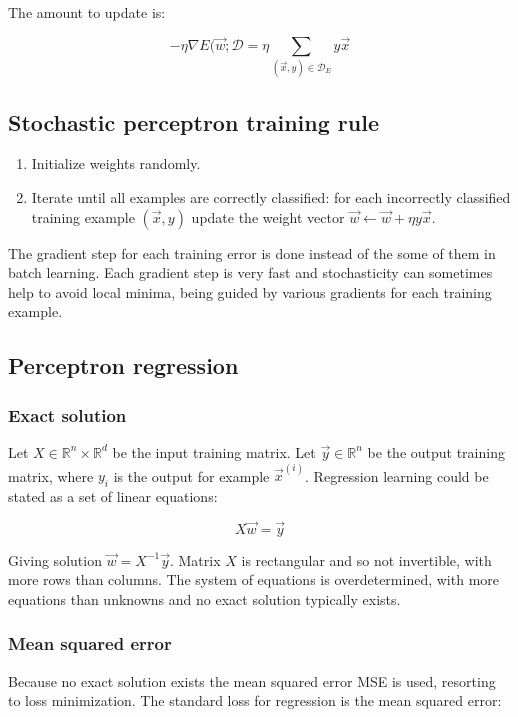 	The amount to update is:

	$$-\eta\nabla E(\vec{w};\mathcal{D} = \eta\sum\limits_{(\vec{x}, y)\in\mathcal{D}_E}y\vec{x}$$

	\subsection{Stochastic perceptron training rule}

	\begin{enumerate}
		\item Initialize weights randomly.
		\item Iterate until all examples are correctly classified: for each incorrectly classified training example $(\vec{x}, y)$ update the weight vector $\vec{w}\leftarrow \vec{w}+\eta y\vec{x}$.
	\end{enumerate}

	The gradient step for each training error is done instead of the some of them in batch learning.
	Each gradient step is very fast and stochasticity can sometimes help to avoid local minima, being guided by various gradients for each training example.

	\subsection{Perceptron regression}

		\subsubsection{Exact solution}
		Let $X\in\mathbb{R}^n\times\mathbb{R}^d$ be the input training matrix.
		Let $\vec{y}\in\mathbb{R}^n$ be the output training matrix, where $y_i$ is the output for example $\vec{x}^{(i)}$.
		Regression learning could be stated as a set of linear equations:

		$$X\vec{w} = \vec{y}$$

		Giving solution $\vec{w} = X^{-1}\vec{y}$.
		Matrix $X$ is rectangular and so not invertible, with more rows than columns.
		The system of equations is overdetermined, with more equations than unknowns and no exact solution typically exists.

		\subsubsection{Mean squared error}
		Because no exact solution exists the mean squared error MSE is used, resorting to loss minimization.
		The standard loss for regression is the mean squared error:


